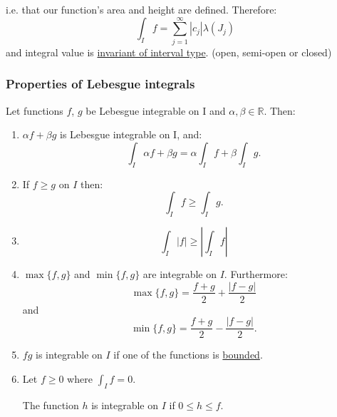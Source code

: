\documentclass{article}
\begin{document}
i.e. that our function's area and height are defined. Therefore:
$$\int_I f = \sum_{j=1}^{\infty} |c_j| \lambda(J_j)$$
and integral value is \underline{invariant of interval type}. (open, semi-open or closed)

\subsubsection{Properties of Lebesgue integrals}
Let functions $f$, $g$ be Lebesgue integrable on I and $\alpha, \beta\in\mathbb{R}$. Then:
\begin{enumerate}
    \item $\alpha f+\beta g$ is Lebesgue integrable on I, and:
    $$\int_I\alpha f+\beta g=\alpha\int_I f + \beta\int_I g.$$

    \item If $f\geq g$ on $I$ then:
    $$\int_I f\geq\int_I g.$$

    \item $$\int_I|f|\geq|\int_I f|$$

    \item $\max\{f,g\}$ and $\min\{f,g\}$ are integrable on $I$. Furthermore:
    $$\max\{f,g\}=\frac{f+g}{2}+\frac{|f-g|}{2}$$
    and
    $$\min\{f,g\}=\frac{f+g}{2}-\frac{|f-g|}{2}.$$

    \item $fg$ is integrable on $I$ if one of the functions is \underline{bounded}.

    \item Let $f\geq0$ where $\displaystyle\int_I f=0$.
    
    The function $h$ is integrable on $I$ if $0\leq h\leq f$.
\end{enumerate}

\newpage
\end{document}
